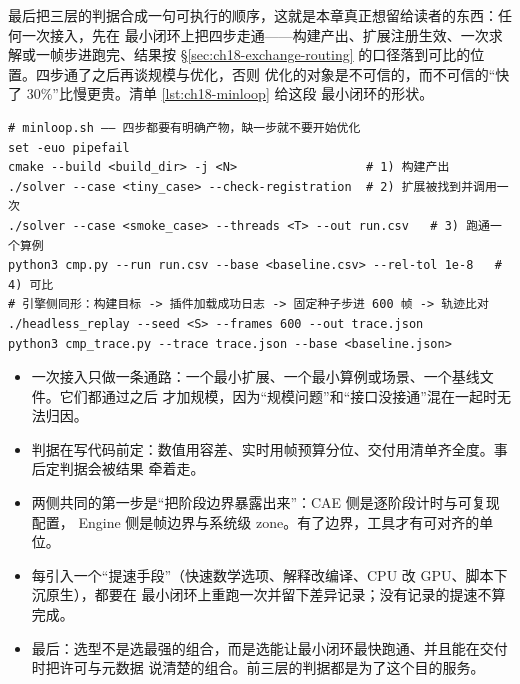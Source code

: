 \documentclass[12pt,a4paper,fontset=fandol]{ctexbook}
\newcommand{\Lang}[1]{\textsf{#1}}
\newcommand{\DomCAE}{\Lang{CAE}}
\newcommand{\DomEngine}{\Lang{Engine}}
\begin{document}
最后把三层的判据合成一句可执行的顺序，这就是本章真正想留给读者的东西：任何一次接入，先在
最小闭环上把四步走通——构建产出、扩展注册生效、一次求解或一帧步进跑完、结果按
\S\ref{sec:ch18-exchange-routing} 的口径落到可比的位置。四步通了之后再谈规模与优化，否则
优化的对象是不可信的，而不可信的``快了 30\%''比慢更贵。清单 \ref{lst:ch18-minloop} 给这段
最小闭环的形状。

\begin{lstlisting}[language=ShellLD, style=shellstyle,
  caption={端到端最小闭环脚手架：构建、注册生效、跑通一步、与基线比},
  label={lst:ch18-minloop}]
# minloop.sh —— 四步都要有明确产物，缺一步就不要开始优化
set -euo pipefail
cmake --build <build_dir> -j <N>                  # 1) 构建产出
./solver --case <tiny_case> --check-registration  # 2) 扩展被找到并调用一次
./solver --case <smoke_case> --threads <T> --out run.csv   # 3) 跑通一个算例
python3 cmp.py --run run.csv --base <baseline.csv> --rel-tol 1e-8   # 4) 可比
# 引擎侧同形：构建目标 -> 插件加载成功日志 -> 固定种子步进 600 帧 -> 轨迹比对
./headless_replay --seed <S> --frames 600 --out trace.json
python3 cmp_trace.py --trace trace.json --base <baseline.json>
\end{lstlisting}

\begin{bestpractice}[title={先做端到端最小闭环，再谈优化}]
\begin{itemize}
\item 一次接入只做一条通路：一个最小扩展、一个最小算例或场景、一个基线文件。它们都通过之后
      才加规模，因为``规模问题''和``接口没接通''混在一起时无法归因。
\item 判据在写代码前定：数值用容差、实时用帧预算分位、交付用清单齐全度。事后定判据会被结果
      牵着走。
\item 两侧共同的第一步是``把阶段边界暴露出来''：\DomCAE{} 侧是逐阶段计时与可复现配置，
      \DomEngine{} 侧是帧边界与系统级 zone。有了边界，工具才有可对齐的单位。
\item 每引入一个``提速手段''（快速数学选项、解释改编译、CPU 改 GPU、脚本下沉原生），都要在
      最小闭环上重跑一次并留下差异记录；没有记录的提速不算完成。
\item 最后：选型不是选最强的组合，而是选能让最小闭环最快跑通、并且能在交付时把许可与元数据
      说清楚的组合。前三层的判据都是为了这个目的服务。
\end{itemize}
\end{bestpractice}

\appendix
\end{document}
